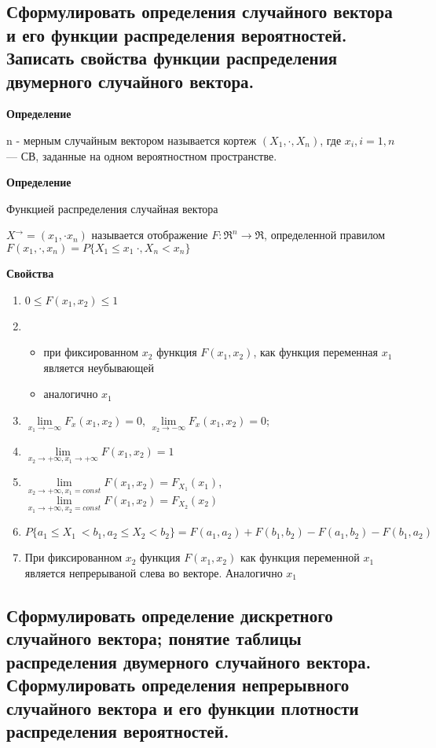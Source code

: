 \subsection{Сформулировать определения случайного вектора и его функции распределения вероятностей. Записать свойства функции распределения двумерного случайного вектора.}

\textbf{Определение}

n - мерным случайным вектором называется кортеж $(X_1, \cdot, X_n)$, где $x_i, i=1,n$ --- СВ, заданные на одном вероятностном пространстве.

\textbf{Определение}

Функцией распределения случайная вектора

$X^\rightarrow = (x_1, \cdot x_n)$ называется отображение $F: \Re^n \rightarrow \Re$, определенной правилом $F(x_1, \cdot, x_n) = P\{X_1 \leq x_1\ \cdot, X_n < x_n\}$

\textbf{Свойства}

\begin{enumerate}[label=\arabic*.]
	\item $0 \leq F(x_1, x_2) \leq 1$
	\item \begin{itemize}
		\item при фиксированном $x_2$ функция $F(x_1, x_2)$, как функция переменная $x_1$ является неубывающей
		\item аналогично $x_1$
	\end{itemize}
	\item $\lim\limits_{x_1 \rightarrow -\infty}F_x(x_1, x_2) = 0$, $\lim\limits_{x_2 \rightarrow -\infty}F_x(x_1, x_2) = 0$;
	\item $\lim\limits_{x_2 \rightarrow +\infty, x_1 \rightarrow +\infty}F(x_1, x_2) = 1$
	\item $\lim\limits_{x_2 \rightarrow +\infty, x_1 = const}F(x_1, x_2) = F_{X_1}(x_1)$, $\lim\limits_{x_1 \rightarrow +\infty, x_2 = const}F(x_1, x_2) = F_{X_2}(x_2)$
	\item $P\{a_1 \leq X_1\ < b_1, a_2 \leq X_2 < b_2\} = F(a_1, a_2) + F(b_1, b_2) - F(a_1, b_2) - F(b_1, a_2)$
	\item При фиксированном $x_2$ функция $F(x_1, x_2)$ как функция переменной $x_1$ является непрерываной слева во векторе. Аналогично $x_1$
\end{enumerate}

\subsection{Сформулировать определение дискретного случайного вектора; понятие таблицы распределения двумерного случайного вектора. Сформулировать определения непрерывного случайного вектора и его функции плотности распределения вероятностей.}

